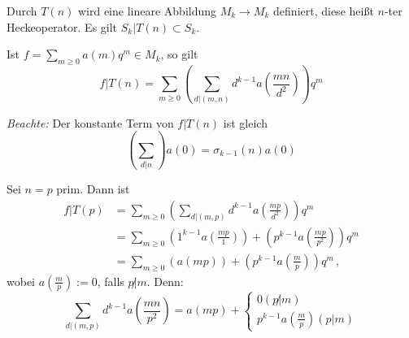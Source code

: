 \begin{satz-list}
\item Durch $T(n)$ wird eine lineare Abbildung $M_k \to M_k$ definiert, diese heißt $n$-ter Heckeoperator. Es gilt $S_k|T(n) \subset S_k$.
\item Ist $f = \sum_{m \geq 0} a(m) q^m \in M_k$, so gilt
\[
f | T(n) = \sum_{m \geq 0} \left( \sum_{d | (m,n)} d^{k-1} a\left(\frac{mn}{d^2}\right) \right) q^m
\]
\end{satz-list}

\emph{Beachte:} Der konstante Term von $f | T(n)$ ist gleich
\[
\left( \sum_{d|n} \right) a(0) = \sigma_{k-1}(n) a(0)
\]

\begin{bsp}
Sei $n = p$ prim. Dann ist
\begin{align*}
f | T(p) &= \sum_{m \geq 0} \left( \sum_{d | (m,p)} d^{k-1} a\left(\frac{mp}{d^2}\right) \right) q^m\\
&= \sum_{m \geq 0} \left( 1^{k-1} a\left(\frac{mp}{1}\right) \right) + \left( p^{k-1} a\left(\frac{mp}{p^2}\right) \right) q^m \\
&= \sum_{m \geq 0} \left( a\left(mp\right) \right) + \left( p^{k-1} a\left(\frac{m}{p}\right) \right) q^m
\,,
\end{align*}
wobei $a\left(\frac mp\right) := 0$, falls $p \not | m$. Denn:
\[
\sum_{d | (m,p)} d^{k-1} a \left( \frac {mn}{p^2} \right) = a \left(mp\right) + \begin{cases} 0 (p \not | m) \\ p^{k-1} a \left(\frac mp \right) (p | m) \end{cases}
\]
\end{bsp}

